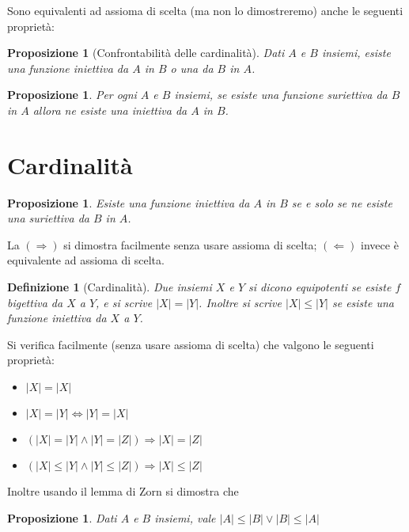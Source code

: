 \documentclass[a4paper,10pt,oneside]{article}
\newcommand{\abs}[1]{\left|#1\right|}
\theoremstyle{plain}
\newtheorem{mydef}[mytheorem]{Definizione}
\newtheorem{myprop}[mytheorem]{Proposizione}
\theoremstyle{definition}
\theoremstyle{remark}
\begin{document}
Sono equivalenti ad assioma di scelta (ma non lo dimostreremo) anche le seguenti proprietà:

\begin{myprop}[Confrontabilità delle cardinalità]
 Dati $A$ e $B$ insiemi, esiste una funzione iniettiva da $A$ in $B$ o una da $B$ in $A$.
\end{myprop}


\begin{myprop}
 Per ogni $A$ e $B$ insiemi, se esiste una funzione suriettiva da $B$ in $A$ allora ne esiste una iniettiva da $A$ in $B$.
\end{myprop}

\section{Cardinalità}

\begin{myprop}
 Esiste una funzione iniettiva da $A$ in $B$ se e solo se ne esiste una suriettiva da $B$ in $A$.
\end{myprop}
La $(\Rightarrow)$ si dimostra facilmente senza usare assioma di scelta; $(\Leftarrow)$ invece è equivalente ad assioma di scelta.

\begin{mydef}[Cardinalità]
 Due insiemi $X$ e $Y$ si dicono equipotenti se esiste $f$ bigettiva da $X$ a $Y$, e si scrive $\abs X=\abs Y$. Inoltre si scrive $\abs X \le \abs Y$ se esiste una funzione iniettiva da $X$ a $Y$.
\end{mydef}

Si verifica facilmente (senza usare assioma di scelta) che valgono le seguenti proprietà:

\begin{itemize}
 \item $\abs X=\abs X$
 \item $\abs X=\abs Y \Leftrightarrow \abs Y=\abs X$
 \item $(\abs X=\abs Y \land \abs Y=\abs Z) \Rightarrow \abs X=\abs Z$
 \item $(\abs X \le \abs Y \land \abs Y \le \abs Z)\Rightarrow \abs X \le \abs Z$
\end{itemize}

Inoltre usando il lemma di Zorn si dimostra che

\begin{myprop}
 Dati $A$ e $B$ insiemi, vale $\abs A\le\abs B \vee \abs B\le\abs A$
\end{myprop}
\end{document}
